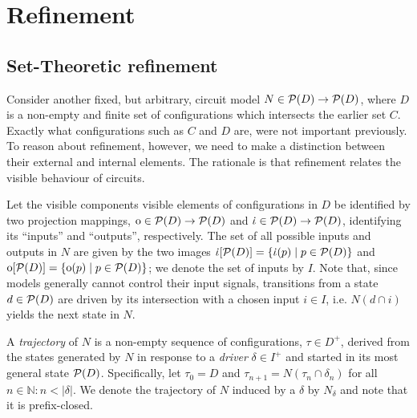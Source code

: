 \section{Refinement}

\subsection{Set-Theoretic refinement}

Consider another fixed, but arbitrary, circuit model $N \in \mathcal{P}(D) \rightarrow \mathcal{P}(D)$, where $D$ is a non-empty and finite set of configurations which intersects the earlier set $C$. Exactly what configurations such as $C$ and $D$ are, were not important previously. To reason about refinement, however, we need to make a distinction between their external and internal elements. The rationale is that refinement relates the visible behaviour of circuits. 




Let the visible components visible elements of configurations in $D$ be identified by two projection mappings, $\operatorname{\mathrm{o}} \in \mathcal{P}(D) \rightarrow \mathcal{P}(D)$ and $\operatorname{\dot{\iota}} \in \mathcal{P}(D) \rightarrow \mathcal{P}(D)$, identifying its ``inputs'' and ``outputs'', respectively. The set of all possible inputs and outputs in $N$ are given by the two images $\operatorname{\dot{\iota}}[\mathcal{P}(D)] = \{ \operatorname{\dot{\iota}}(p) \mid p \in \mathcal{P}(D) \}$ and $\operatorname{\mathrm{o}}[\mathcal{P}(D)] = \{ \operatorname{\mathrm{o}}(p) \mid p \in \mathcal{P}(D) \}$; we denote the set of inputs by $I$. Note that, since models generally cannot control their input signals, transitions from a state $d \in \mathcal{P}(D)$ are driven by its intersection with a chosen input $i \in I$, i.e. $N(d \cap i)$ yields the next state in $N$.


A \textit{trajectory} of $N$ is a non-empty sequence of configurations, $\tau \in D^{+}$, derived from the states generated by $N$ in response to a \textit{driver} $\delta \in I^{+}$ and started in its most general state $\mathcal{P}(D)$. Specifically, let $\tau_{0} = D$ and $\tau_{n+1} = N(\tau_{n} \cap \delta_{n})$ for all $n \in \mathbb{N} : n < | \delta |$. We denote the trajectory of $N$ induced by a $\delta$ by $N_{\delta}$ and note that it is prefix-closed. 

